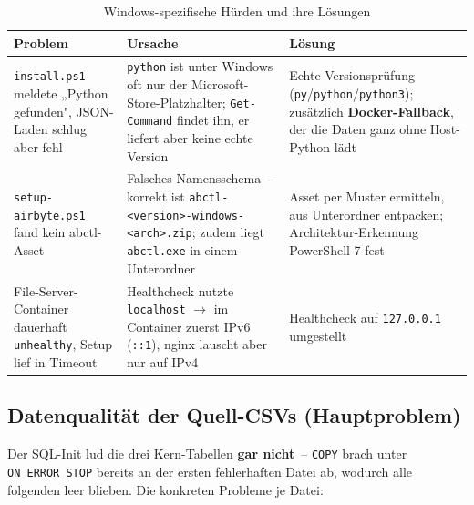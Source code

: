 \documentclass[a4paper,12pt]{article}
\begin{document}
\begin{table}[H]
    \caption{Windows-spezifische Hürden und ihre Lösungen}
    \centering\small
    \begin{tabular}{@{}L{5cm}L{4.5cm}L{5cm}@{}}
        \toprule
        \textbf{Problem} & \textbf{Ursache} & \textbf{Lösung} \\
        \midrule
        \texttt{install.ps1} meldete „Python gefunden", JSON-Laden schlug aber fehl &
            \texttt{python} ist unter Windows oft nur der Microsoft-Store-Platz\-halter;
            \texttt{Get-Command} findet ihn, er liefert aber keine echte Version &
            Echte Versionsprüfung (\texttt{py}/\texttt{python}/\texttt{python3});
            zusätzlich \textbf{Docker-Fallback}, der die Daten ganz ohne Host-Python lädt \\
        \addlinespace[4pt]
        \texttt{setup-airbyte.ps1} fand kein abctl-Asset &
            Falsches Namensschema~-- korrekt ist
            \texttt{abctl-<version>-}\linebreak\texttt{windows-<arch>.zip};
            zudem liegt \texttt{abctl.exe} in einem Unterordner &
            Asset per Muster ermitteln, aus Unterordner entpacken;
            Architektur-Erkennung PowerShell-7-fest \\
        \addlinespace[4pt]
        File-Server-Container dauerhaft \texttt{unhealthy}, Setup lief in Timeout &
            Healthcheck nutzte \texttt{localhost} $\to$ im Container zuerst IPv6
            (\texttt{::1}), nginx lauscht aber nur auf IPv4 &
            Healthcheck auf \texttt{127.0.0.1} umgestellt \\
        \bottomrule
    \end{tabular}
\end{table}
 
\subsection{Datenqualität der Quell-CSVs (Hauptproblem)}
\label{sec:loesungen-datenqualitaet}
 
Der SQL-Init lud die drei Kern-Tabellen \textbf{gar nicht}~-- \texttt{COPY} brach unter
\texttt{ON\_ERROR\_STOP} bereits an der ersten fehlerhaften Datei ab, wodurch alle
folgenden leer blieben. Die konkreten Probleme je Datei:
 
\end{document}
